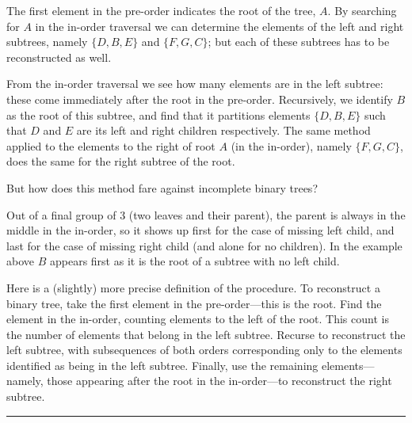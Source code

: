 \documentclass{report}
\newcommand{\okthen}{\rule[-1.4pt]{0.3em}{0.77em}}
\begin{document}
The first element in the pre-order indicates the root of the tree, $A$. By searching for $A$ in the in-order traversal we can determine the elements of the left and right subtrees, namely $\{D,B,E\}$ and $\{F,G,C\}$; but each of these subtrees has to be reconstructed as well.

From the in-order traversal we see how many elements are in the left subtree: these come immediately after the root in the pre-order. Recursively, we identify $B$ as the root of this subtree, and find that it partitions elements $\{D,B,E\}$ such that $D$ and $E$ are its left and right children respectively. The same method applied to the elements to the right of root $A$ (in the in-order), namely $\{F,G,C\}$, does the same for the right subtree of the root.

But how does this method fare against incomplete binary trees?

\begin{center}
\end{center}

Out of a final group of 3 (two leaves and their parent), the parent is always in the middle in the in-order, so it shows up first for the case of missing left child, and last for the case of missing right child (and alone for no children). In the example above %
$B$ appears first as it is the root of a subtree with no left child.

\smallskip

Here is a (slightly) more precise definition of the procedure. To reconstruct a binary tree, take the first element in the pre-order---this is the root. Find the element in the in-order, counting elements to the left of the root. This count is the number of elements that belong in the left subtree. Recurse to reconstruct the left subtree, with subsequences of both orders corresponding only to the elements identified as being in the left subtree. Finally, use the remaining elements---namely, those appearing after the root in the in-order---to reconstruct the right subtree.\ \okthen

\smallskip
\end{document}
